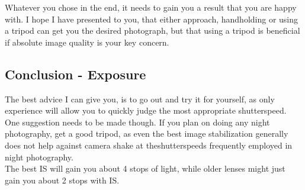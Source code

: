 Whatever you chose in the end, it needs to gain you a result that you are happy with. I hope I have presented to you, that either approach, handholding or using a tripod can get you the desired photograph, but that using a tripod is beneficial if absolute image quality is your key concern.

\subsection{Conclusion - Exposure}

The best advice I can give you, is to go out and try it for yourself, as only experience will allow you to quickly judge the most appropriate \gls{shutterspeed}.
\\[\baselineskip]
One suggestion needs to be made though. If you plan on doing any night photography, get a good tripod, as even the best image stabilization generally does not help against camera shake at the\glspl{shutterspeed} frequently employed in night photography.
\\
The best \gls{IS} will gain you about 4 \glspl{stop} of light, while older lenses might just gain you about 2 \glspl{stop} with \gls{IS}.
